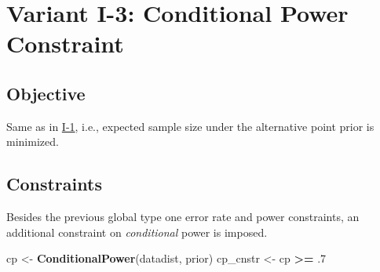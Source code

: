 \documentclass[
]{book}
\newenvironment{Shaded}{\begin{snugshade}}{\end{snugshade}}
\newcommand{\DecValTok}[1]{\textcolor[rgb]{0.00,0.00,0.81}{#1}}
\newcommand{\FloatTok}[1]{\textcolor[rgb]{0.00,0.00,0.81}{#1}}
\newcommand{\KeywordTok}[1]{\textcolor[rgb]{0.13,0.29,0.53}{\textbf{#1}}}
\newcommand{\NormalTok}[1]{#1}
\newcommand{\OperatorTok}[1]{\textcolor[rgb]{0.81,0.36,0.00}{\textbf{#1}}}
\newcommand{\StringTok}[1]{\textcolor[rgb]{0.31,0.60,0.02}{#1}}
\begin{document}
\begin{Shaded}
\end{Shaded}

\hypertarget{variantI_3}{%
\section{Variant I-3: Conditional Power Constraint}\label{variantI_3}}

\hypertarget{objective-2}{%
\subsection{Objective}\label{objective-2}}

Same as in \protect\hyperlink{variantI_1}{I-1}, i.e., expected sample size under the
alternative point prior is minimized.

\hypertarget{constraints-2}{%
\subsection{Constraints}\label{constraints-2}}

Besides the previous global type one error rate and power constraints,
an additional constraint on \emph{conditional} power is imposed.

\begin{Shaded}
\begin{Highlighting}[]
\NormalTok{cp       \textless{}{-}}\StringTok{ }\KeywordTok{ConditionalPower}\NormalTok{(datadist, prior)}
\NormalTok{cp\_cnstr \textless{}{-}}\StringTok{ }\NormalTok{cp }\OperatorTok{\textgreater{}=}\StringTok{ }\FloatTok{.7}
\end{Highlighting}
\end{Shaded}
\end{document}
